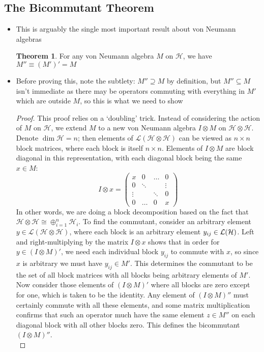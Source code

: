 \documentclass[12pt,a4paper]{article}
\numberwithin{equation}{section}
\theoremstyle{definition}
\theoremstyle{theorem}
\newtheorem{theorem}{Theorem}[section]
\begin{document}
	\subsection{The Bicommutant Theorem}
	\begin{itemize}
		\item This is arguably the single most important result about von Neumann algebras
		\begin{theorem}
			For any von Neumann algebra $M$ on $\mathcal{H}$, we have $M''\equiv(M')'=M$
		\end{theorem}
		\item Before proving this, note the subtlety: $M''\supseteq M$ by definition, but $M''\subseteq M$ isn't immediate as there may be operators commuting with everything in $M'$ which are outside $M$, so this is what we need to show
		\begin{proof}
			This proof relies on a `doubling' trick. Instead of considering the action of $M$ on $\mathcal{H}$, we extend $M$ to a new von Neumann algebra $I\otimes M$ on $\mathcal{H}\otimes \mathcal{H}$.\\
			Denote $\dim{\mathcal{H}}=n$; then elements of $\mathcal{L}(\mathcal{H}\otimes\mathcal{H})$ can be viewed as $n\times n$ block matrices, where each block is itself $n\times n$. Elements of $I\otimes M$ are block diagonal in this representation, with each diagonal block being the same $x\in M$:
			\begin{equation}
				I\otimes x=\begin{pmatrix}
					x&0&\dots&0\\
					0&\ddots&&\vdots\\
					\vdots&&\ddots&0\\
					0&\dots&0&x
				\end{pmatrix}
			\end{equation}
			In other words, we are doing a block decomposition based on the fact that $\mathcal{H}\otimes\mathcal{H}\cong \oplus_{i=1}^{n}\mathcal{H}_{i}$. To find the commutant, consider an arbitrary element $y\in\mathcal{L}(\mathcal{H}\otimes \mathcal{H})$, where each block is an arbitrary element $y_{ij}\in \mathcal{L}(\mathcal{H})$. Left and right-multiplying by the matrix $I\otimes x$ shows that in order for $y\in(I\otimes M)'$, we need each individual block $y_{ij}$ to commute with $x$, so since $x$ is arbitrary we must have $y_{ij}\in M'$. This determines the commutant to be the set of all block matrices with all blocks being arbitrary elements of $M'$.\\
			Now consider those elements of $(I\otimes M)'$ where all blocks are zero except for one, which is taken to be the identity. Any element of $(I\otimes M)''$ must certainly commute with all these elements, and some matrix multiplication confirms that such an operator much have the same element $z\in M''$ on each diagonal block with all other blocks zero. This defines the bicommutant $(I\otimes M)''$.\\

\end{proof}
\end{itemize}
\end{document}
